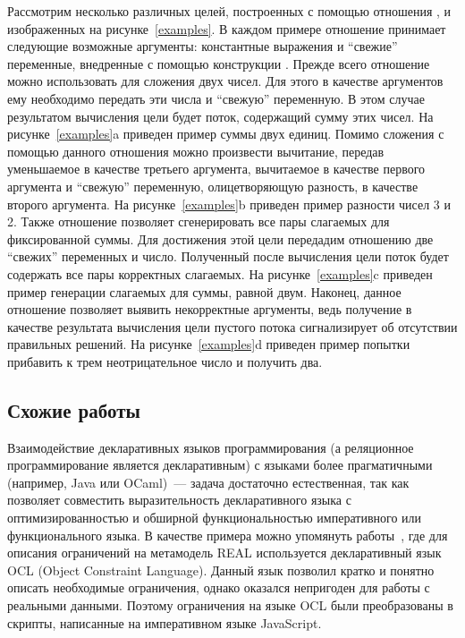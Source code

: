 Рассмотрим несколько различных целей, построенных с помощью отношения , и изображенных на рисунке~\ref{examples}. В каждом примере отношение принимает следующие возможные аргументы: константные выражения и ``свежие'' переменные, внедренные с помощью конструкции .
Прежде всего отношение  можно использовать для сложения двух чисел. Для этого в качестве аргументов ему необходимо передать эти числа и ``свежую'' переменную. В этом случае результатом вычисления цели будет поток, содержащий сумму этих чисел. На рисунке~\ref{examples}a приведен пример суммы двух единиц. Помимо сложения с помощью данного отношения можно произвести вычитание, передав уменьшаемое в качестве третьего аргумента, вычитаемое в качестве первого аргумента и ``свежую'' переменную, олицетворяющую разность, в качестве второго аргумента. На рисунке~\ref{examples}b приведен пример разности чисел 3 и 2. Также отношение  позволяет сгенерировать все пары слагаемых для фиксированной суммы. Для достижения этой цели передадим отношению две ``свежих'' переменных и число. Полученный после вычисления цели поток будет содержать все пары корректных слагаемых. На рисунке~\ref{examples}c приведен пример генерации слагаемых для суммы, равной двум. Наконец, данное отношение позволяет выявить некорректные аргументы, ведь получение в качестве результата вычисления цели пустого потока сигнализирует об отсутствии правильных решений. На рисунке~\ref{examples}d приведен пример попытки прибавить к трем неотрицательное число и получить два.

\subsection{Схожие работы}

Взаимодействие декларативных языков программирования (а реляционное программирование является декларативным) с языками более прагматичными (например, Java или OCaml)~--- задача достаточно естественная, так как позволяет совместить выразительность декларативного языка с оптимизированностью и обширной функциональностью императивного или функционального языка. В качестве примера можно упомянуть работы~\cite{OCLtoJS_1, OCLtoJS_2}, где для описания ограничений на метамодель REAL \cite{terehov1, terehov2} используется декларативный язык OCL (Object Constraint Language). Данный язык позволил кратко и понятно описать необходимые ограничения, однако оказался непригоден для работы с реальными данными. Поэтому ограничения на языке OCL были преобразованы в скрипты, написанные на императивном языке JavaScript.

